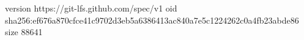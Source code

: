 version https://git-lfs.github.com/spec/v1
oid sha256:ef676a870cfce41c9702d3eb5a6386413ac840a7e5c1224262c0a4fb23abde86
size 88641
